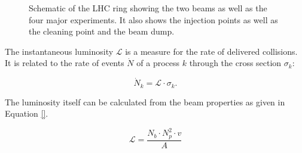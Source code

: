 \begin{figure}[htbp!]
  \begin{center}

\caption{Schematic of the LHC ring showing the two beams as well as the four major experiments. It also shows the injection points as well as the cleaning point and the beam dump. \cite{1748-0221-3-08-S08001}
  \label{fig:det_LHC}}
  \end{center}
\end{figure}

The instantaneous luminosity $\mathcal{L}$ is a measure for the rate of delivered collisions.
It is related to the rate of events $\dot N$ of a process $k$ through the cross section $\sigma_k$:

\begin{equation}
\dot N_k = \mathcal{L} \cdot \sigma_k.
\end{equation}

The luminosity itself can be calculated from the beam properties as given in Equation \ref{}.

\begin{equation}
\mathcal{L} = \frac{N_b \cdot N_p^2 \cdot v}{A}
\end{equation}

